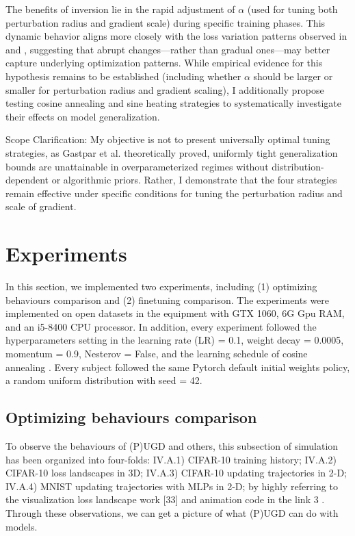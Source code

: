 \documentclass[10pt,twocolumn,letterpaper]{article}
\begin{document}
The benefits of inversion lie in the rapid adjustment of $\alpha$ (used for tuning both perturbation radius and gradient scale) during specific training phases. This dynamic behavior aligns more closely with the loss variation patterns observed in  and , suggesting that abrupt changes—rather than gradual ones—may better capture underlying optimization patterns. While empirical evidence for this hypothesis remains to be established (including whether $\alpha$ should be larger or smaller for perturbation radius and gradient scaling), I additionally propose testing cosine annealing and sine heating strategies to systematically investigate their effects on model generalization.

Scope Clarification: My objective is not to present universally optimal tuning strategies, as Gastpar et al. \cite{gastpar2023fantasticgeneralizationmeasures} theoretically proved, uniformly tight generalization bounds are unattainable in overparameterized regimes without distribution-dependent or algorithmic priors. Rather, I demonstrate that the four strategies remain effective under specific conditions for tuning the perturbation radius and scale of gradient.


\section{Experiments}
\label{sec:4}

In this section, we implemented two experiments, including (1) optimizing behaviours comparison and (2) finetuning comparison. The experiments were implemented on open datasets in the equipment with GTX 1060, 6G Gpu RAM, and an i5-8400 CPU processor. In addition, every experiment followed the hyperparameters setting in the learning rate (LR)	= 0.1, weight decay = 0.0005, momentum = 0.9, Nesterov = False, and the learning schedule of cosine annealing \cite{loshchilov2017sgdrstochasticgradientdescent}. Every subject followed the same Pytorch 
default initial weights policy, a random uniform distribution with seed = 42. 

\subsection{Optimizing behaviours comparison}
\label{subsec:4.1}

To observe the behaviours of (P)UGD and others, this subsection of simulation has been organized into four-folds:  
IV.A.1) CIFAR-10 training history; IV.A.2) CIFAR-10 loss 
landscapes in 3D; IV.A.3) CIFAR-10 updating trajectories in 
2-D; IV.A.4) MNIST updating trajectories with MLPs in 2-D; 
by highly referring to the visualization loss landscape work 
[33]  and animation code in the link 3 . Through these 
observations, we can get a picture of what (P)UGD can do 
with models. 
\end{document}

